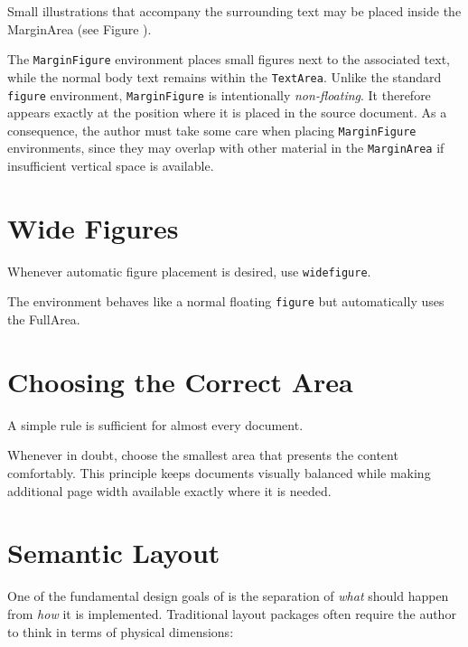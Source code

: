 \documentclass[
11pt,
a4paper,
oneside
]{scrbook}
\begin{document}
Small illustrations that accompany the surrounding text may be placed inside
the MarginArea (see Figure ).
\begin{MarginFigure}
	\caption{The basic \MDWordmark layout model}
\end{MarginFigure}




The \texttt{MarginFigure} environment places small figures next 
to the associated text, while the normal body text remains 
within the \texttt{TextArea}.
Unlike the standard \texttt{figure} environment,
\texttt{MarginFigure} is intentionally \emph{non-floating}.
It therefore appears exactly at the position where it is placed
in the source document.
As a consequence, the author must take some care when placing
\texttt{MarginFigure} environments, since they may overlap with
other material in the \texttt{MarginArea} if insufficient vertical
space is available.


\section{Wide Figures}

Whenever automatic figure placement is desired, use
\texttt{widefigure}.




The environment behaves like a normal floating
\texttt{figure} but automatically uses the FullArea.


\section{Choosing the Correct Area}

A simple rule is sufficient for almost every document.
\begin{center}
\end{center}
Whenever in doubt, choose the smallest area that presents the content
comfortably.
This principle keeps documents visually balanced while making additional page
width available exactly where it is needed.

\section{Semantic Layout}
One of the fundamental design goals of \MDWordmark is the separation of
\emph{what} should happen from \emph{how} it is implemented.
Traditional layout packages often require the author to think in terms of
physical dimensions:
\end{document}
